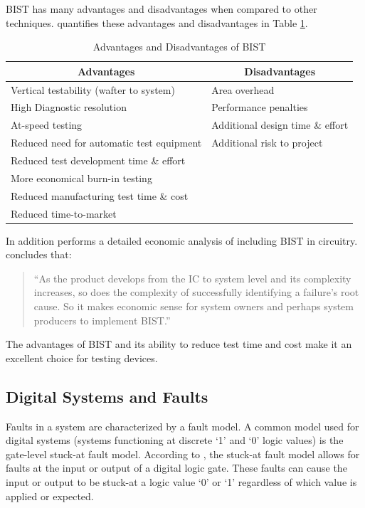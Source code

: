 \documentclass[12pt]{report}
\begin{document}
BIST has many advantages and disadvantages when compared to other techniques.  \cite{stroud} quantifies these advantages and disadvantages in Table \ref{tbl:advantages}. 
\begin{table}
	\caption{Advantages and Disadvantages of BIST\cite{stroud}}
	\begin{center}
	\begin{tabular}{|l|l|}
		\hline
		\multicolumn{1}{|c|}{{\bf Advantages}} & \multicolumn{1}{|c|}{{\bf Disadvantages}} \\ \hline
		Vertical testability (wafter to system) & Area overhead \\ \hline
		High Diagnostic resolution & Performance penalties \\ \hline
		At-speed testing & Additional design time \& effort \\ \hline
		Reduced need for automatic test equipment & Additional risk to project \\ \hline
		Reduced test development time \& effort & \\ \hline
		More economical burn-in testing & \\ \hline
		Reduced manufacturing test time \& cost & \\ \hline
		Reduced time-to-market & \\ \hline
	\end{tabular}
	\end{center}
	\label{tbl:advantages}
\end{table}
In addition \cite{ungar} performs a detailed economic analysis of including BIST in circuitry. \cite{ungar} concludes that:
\begin{quote}
``As the product develops from the IC to system level and its complexity increases, so does the complexity of successfully identifying a failure's root cause.  So it makes economic sense for system owners and perhaps system producers to implement BIST.\cite{ungar}''
\end{quote}
The advantages of BIST and its ability to reduce test time and cost make it an excellent choice for testing devices\cite{zorian}.

\subsection{Digital Systems and Faults}
\label{sct:digitalsystems}
Faults in a system are characterized by a fault model.  A common model used for digital systems (systems functioning at discrete `1' and `0' logic values) is the gate-level stuck-at fault model\cite{stroud}.  According to \cite{stroud}, the stuck-at fault model allows for faults at the input or output of a digital logic gate.  These faults can cause the input or output to be stuck-at a logic value `0' or `1' regardless of which value is applied or expected.  
\end{document}
